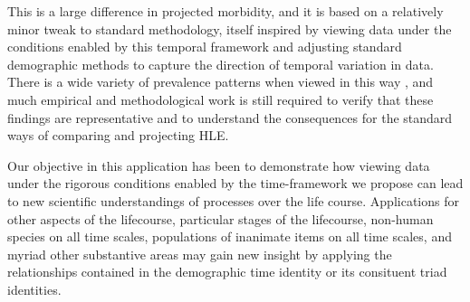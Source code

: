 \documentclass[12pt,oneside,a4paper]{article} %
\begin{document}
This is a large difference in projected morbidity, and it is based on a
relatively minor tweak to standard methodology, itself inspired by viewing data under the conditions
enabled by this temporal framework and adjusting standard demographic methods
to capture the direction of temporal variation in data. There is a wide variety
of prevalence patterns when viewed in this way \citep{riffe2015ttd,
wolf2015disability}, and much empirical and methodological work is still required to verify
that these findings are representative and to understand the consequences for
the standard ways of comparing and projecting HLE. 

Our objective in this application has been
to demonstrate how viewing data under the rigorous conditions enabled by the
time-framework we propose can lead to new scientific understandings of
processes over the life course. Applications for other aspects of the
lifecourse, particular stages of the lifecourse, non-human species on all time
scales, populations of inanimate items on all time scales, and myriad other
substantive areas may gain new insight by applying the relationships contained
in the demographic time identity or its consituent triad identities.




\end{document}
